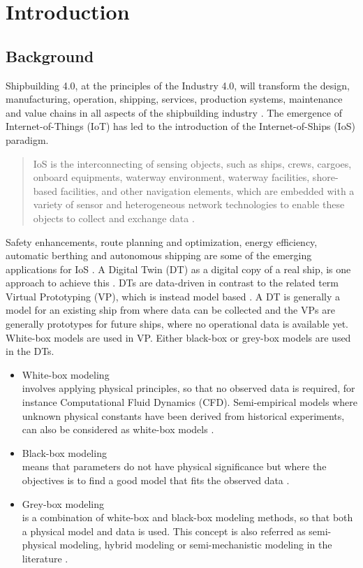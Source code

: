 \chapter{Introduction}
\section{Background}
Shipbuilding 4.0, at the principles of the Industry 4.0, will transform the design, manufacturing, operation, shipping, services, production systems, maintenance and value chains in all aspects of the shipbuilding 
industry \cite{stanic_toward_2018}.
The emergence of Internet-of-Things (IoT) has led to the introduction of the Internet-of-Ships (IoS) paradigm. \begin{quote} IoS is the interconnecting of sensing objects, such as ships, crews, cargoes, onboard equipments, waterway environment, waterway facilities, shore-based facilities, and other navigation elements, which are embedded with a variety of sensor and heterogeneous network technologies to enable these objects to collect and exchange data \cite{liu_internet_2016-1}.\end{quote}
Safety enhancements, route planning and optimization, energy efficiency, automatic berthing and autonomous shipping are some of the emerging applications for IoS \cite{aslam_internet_2020}.
A Digital Twin (DT) as a digital copy of a real ship, is one approach to achieve this \cite{chen_review_2021}. 
DTs are data-driven in contrast to the related term Virtual Prototyping (VP), which is instead model based \cite{major_framework_2021}. A DT is generally a model for an existing ship from where data can be collected and the VPs are generally prototypes for future ships, where no operational data is available yet.
White-box models are used in VP. Either black-box or grey-box models are used in the DTs. 

\begin{itemize}
    \item White-box modeling \\
    involves applying physical principles, so that no observed data is required, for instance Computational Fluid Dynamics (CFD). Semi-empirical models where unknown physical constants have been derived from historical experiments, can also be considered as white-box models \cite{leifsson_grey-box_2008}.  

    \item Black-box modeling \\
    means that parameters do not have physical significance but where the objectives is to find a good model that fits the observed data \cite{lindskog_tools_1995}.
    
    \item Grey-box modeling \\
    is a combination of white-box and black-box modeling methods, so that both a physical model and data is used. This concept is also referred as semi-physical modeling, hybrid modeling or semi-mechanistic modeling in the literature \cite{leifsson_grey-box_2008}. 
\end{itemize}

